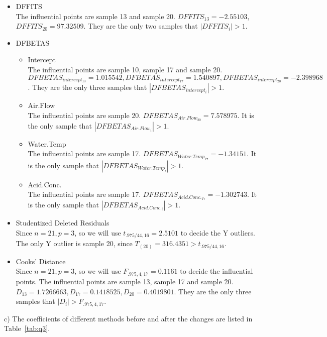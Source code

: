 \documentclass[12pt]{article}
\begin{document}
\begin{itemize}
\item DFFITS\\
  The influential points are sample 13 and sample 20. $DFFITS_{13} =
  -2.55103$, $DFFITS_{20} = 97.32509$. They are the only two samples
  that $|DFFITS_i| > 1$.
\item DFBETAS
  \begin{itemize}
  \item Intercept\\
    The influential points are sample 10, sample 17 and sample
    20. $DFBETAS_{intercept_{13}} = 1.015542, DFBETAS_{intercept_{17}}
    = 1.540897, DFBETAS_{intercept_{20}} = -2.398968$. They are the
    only three samples that $|DFBETAS_{intercept_{i}}| > 1$.
  \item Air.Flow\\
    The influential points are sample 20. $DFBETAS_{Air.Flow_{20}} =
    7.578975$. It is the only sample that $|DFBETAS_{Air.Flow_{i}}| >
    1$.
  \item Water.Temp\\
    The influential points are sample 17. $DFBETAS_{Water.Temp_{17}} =
    -1.34151$. It is the only sample that $|DFBETAS_{Water.Temp_{i}}|
    > 1$.
  \item Acid.Conc.\\
    The influential points are sample 17. $DFBETAS_{Acid.Conc._{17}} =
    -1.302743$. It is the only sample that $|DFBETAS_{Acid.Conc._{i}}|
    > 1$.
  \end{itemize}
\item Studentized Deleted Residuals\\
  Since $n = 21, p = 3$, so we will use $t_{.975/44,16} = 2.5101$ to
  decide the Y outliers. The only Y outlier is sample 20, since 
  $T_{(20)} = 316.4351 > t_{.975/44,16}$.
\item Cooks' Distance\\
  Since $n = 21, p = 3$, so we will use $F_{.975, 4, 17} = 0.1161$ to
  decide the influential points. The influential points are sample 13,
  sample 17 and sample 20. $D_{13} = 1.7266663, D_{17} = 0.1418525,
  D_{20} = 0.4019801$. They are the only three samples that $|D_i| >
  F_{.975, 4, 17}$.
\end{itemize}

c) The coefficients of different methods before and after the changes
are listed in Table~\ref{tab:q3}.
\end{document}
